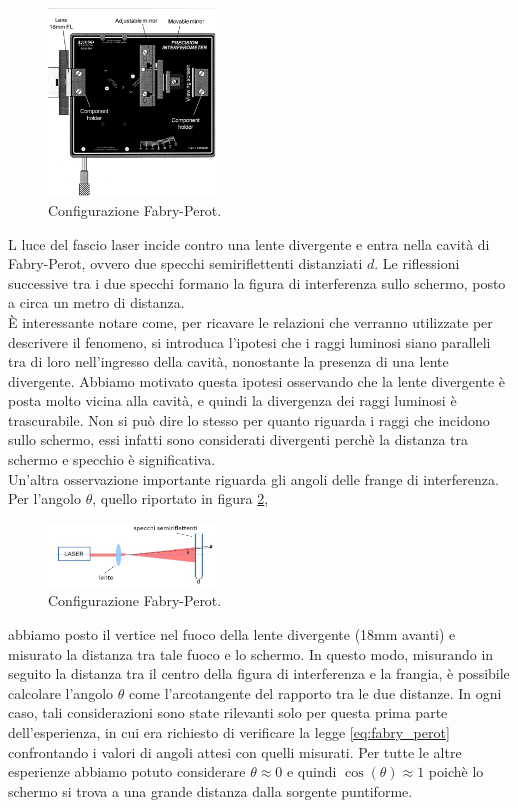 \documentclass[letterpaper,12pt]{article}
\begin{document}
\begin{figure}[ht]
    \centering
    \includegraphics[width=0.4\textwidth]{InterferometroFabry.png}
    \caption{Configurazione Fabry-Perot.}
    \label{fig:fabry-perot config}
\end{figure}

L luce del fascio laser incide contro una lente divergente e entra nella cavità di Fabry-Perot, ovvero due specchi semiriflettenti 
distanziati $d$. Le riflessioni successive tra i due specchi formano la figura di interferenza sullo schermo, posto
a circa un metro di distanza. \\ 
È interessante notare come, per ricavare le relazioni che verranno utilizzate per descrivere il fenomeno, si 
introduca l'ipotesi che i raggi luminosi siano paralleli tra di loro nell'ingresso della cavità, nonostante la 
presenza di una lente divergente. Abbiamo motivato questa ipotesi osservando che la lente divergente è posta
molto vicina alla cavità, e quindi la divergenza dei raggi luminosi è trascurabile. Non si può dire lo stesso per 
quanto riguarda i raggi che incidono sullo schermo, essi infatti sono considerati divergenti perchè la distanza tra
schermo e specchio è significativa.\\
Un'altra osservazione importante riguarda gli angoli delle frange di interferenza. 
Per l'angolo $\theta$, quello riportato in figura \ref{fig:fabry_perot_scheda},
\begin{figure}[h!]
    \centering
    \includegraphics[width=0.4\textwidth]{fabry_perot_config.JPG}
    \caption{Configurazione Fabry-Perot.}
    \label{fig:fabry_perot_scheda}
\end{figure}

abbiamo posto il vertice nel fuoco della lente divergente (18mm avanti) e misurato la distanza tra tale fuoco e lo schermo. In questo modo, misurando in seguito
la distanza tra il centro della figura di interferenza e la frangia, è possibile calcolare l'angolo $\theta$ come 
l'arcotangente del rapporto tra le due distanze. In ogni caso, tali considerazioni sono state rilevanti solo per questa  
prima parte dell'esperienza, in cui era richiesto di verificare la legge \ref{eq:fabry_perot} confrontando i valori di 
angoli attesi con quelli misurati. Per tutte le altre esperienze abbiamo potuto considerare $\theta \approx 0$ e quindi 
$\cos(\theta) \approx 1$ poichè lo schermo si trova a una grande distanza dalla sorgente puntiforme.
\end{document}
